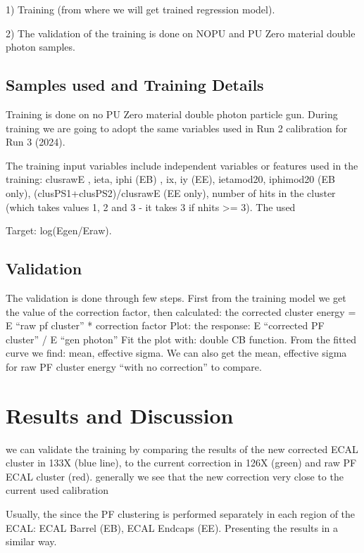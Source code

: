 1) Training (from where we will get trained regression model). 

2) The validation of the training is done on NOPU and PU Zero material double photon samples.

\subsection{Samples used and Training Details}

Training is done on no PU Zero material double photon particle gun. During training we are going to adopt the same variables used in Run 2 calibration for Run 3 (2024). 

The training input variables include independent variables or features used in the training:  
	clusrawE , ieta, iphi (EB) , ix, iy (EE), ietamod20, iphimod20 (EB only), (clusPS1+clusPS2)/clusrawE (EE only), number of hits in the cluster (which takes values 1, 2 and 3 - it takes 3 if nhits >= 3). The used  

Target: log(Egen/Eraw). 

 
\subsection{Validation}

The validation is done through few steps. First from the training model we get the value of the correction factor, then calculated:  the corrected cluster energy = E “raw pf cluster” * correction factor Plot: the response: E “corrected PF cluster” / E “gen photon” Fit the plot with: double CB function. From the fitted curve we find: mean, effective sigma. We can also get the mean, effective sigma for raw PF cluster energy “with no correction” to compare. 

\section{Results and Discussion}

we can validate the training by comparing the results of the new corrected ECAL cluster in 133X (blue line), to the current  correction in 126X (green) and  raw PF ECAL cluster (red).
generally we see that the new  correction very close to the current used calibration

Usually, the since the PF clustering is performed separately in each region of the ECAL: ECAL Barrel (EB), ECAL Endcaps (EE).
Presenting the results in a similar way.

